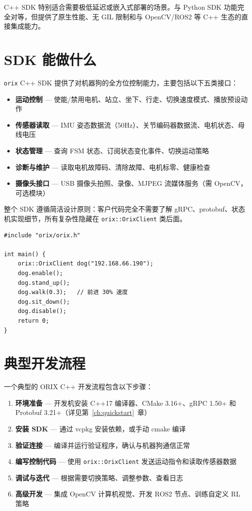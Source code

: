 \documentclass[a4paper,11pt,openany]{book}
\begin{document}
C++ SDK 特别适合需要极低延迟或嵌入式部署的场景。与 Python SDK 功能完全对等，但提供了原生性能、无 GIL 限制和与 OpenCV/ROS2 等 C++ 生态的直接集成能力。

\section{SDK 能做什么}

\texttt{orix} C++ SDK 提供了对机器狗的全方位控制能力，主要包括以下五类接口：

\begin{itemize}
  \item \textbf{运动控制} --- 使能/禁用电机、站立、坐下、行走、切换速度模式、播放预设动作
  \item \textbf{传感器读取} --- IMU 姿态数据流（50Hz）、关节编码器数据流、电机状态、母线电压
  \item \textbf{状态管理} --- 查询 FSM 状态、订阅状态变化事件、切换运动策略
  \item \textbf{诊断与维护} --- 读取电机故障码、清除故障、电机标零、健康检查
  \item \textbf{摄像头接口} --- USB 摄像头拍照、录像、MJPEG 流媒体服务（需 OpenCV，可选模块）
\end{itemize}

整个 SDK 遵循简洁设计原则：客户代码完全不需要了解 gRPC、protobuf、状态机实现细节，所有复杂性隐藏在 \texttt{orix::OrixClient} 类后面。

\begin{lstlisting}[style=cpp]
#include "orix/orix.h"

int main() {
    orix::OrixClient dog("192.168.66.190");
    dog.enable();
    dog.stand_up();
    dog.walk(0.3);   // 前进 30% 速度
    dog.sit_down();
    dog.disable();
    return 0;
}
\end{lstlisting}

\section{典型开发流程}

一个典型的 ORIX C++ 开发流程包含以下步骤：

\begin{enumerate}
  \item \textbf{环境准备} --- 开发机安装 C++17 编译器、CMake 3.16+、gRPC 1.50+ 和 Protobuf 3.21+（详见第~\ref{ch:quickstart}~章）
  \item \textbf{安装 SDK} --- 通过 vcpkg 安装依赖，或手动 cmake 编译
  \item \textbf{验证连接} --- 编译并运行验证程序，确认与机器狗通信正常
  \item \textbf{编写控制代码} --- 使用 \texttt{orix::OrixClient} 发送运动指令和读取传感器数据
  \item \textbf{调试与迭代} --- 根据需要切换策略、调整参数、查看日志
  \item \textbf{高级开发} --- 集成 OpenCV 计算机视觉、开发 ROS2 节点、训练自定义 RL 策略
\end{enumerate}
\end{document}
